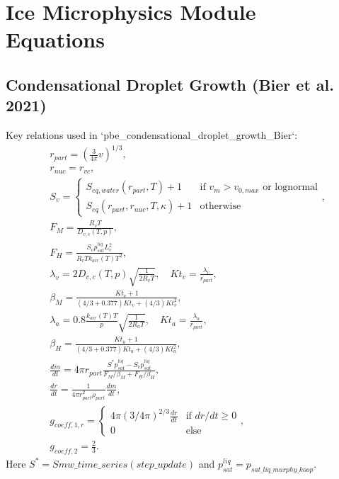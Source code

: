 \documentclass{article}
\begin{document}
\section*{Ice Microphysics Module Equations}

\subsection*{Condensational Droplet Growth (Bier et al. 2021)}
Key relations used in `pbe_condensational_droplet_growth_Bier`:
\begin{align}
&r_{part} = \left(\frac{3}{4\pi} v\right)^{1/3}, \\
&r_{nuc} = r_{vc}, \\
&S_v = \begin{cases}S_{eq,water}(r_{part},T)+1 & \text{if } v_m>v_{0,max} \text{ or lognormal}\\ S_{eq}(r_{part},r_{nuc},T,\kappa)+1 & \text{otherwise}\end{cases}, \\
&F_M = \frac{R_v T}{D_{v,c}(T,p)}, \\
&F_H = \frac{S_v p_{sat}^{liq} L_c^2}{R_v T k_{air}(T) T^2}, \\
&\lambda_v = 2 D_{v,c}(T,p)\sqrt{\frac{1}{2R_v T}}, \quad
K
t_v= \frac{\lambda_v}{r_{part}}, \\
&\beta_M = \frac{K
t_v+1}{(4/3+0.377)K
t_v+(4/3)K
t_v^2}, \\
&\lambda_a = 0.8 \frac{k_{air}(T)T}{p}\sqrt{\frac{1}{2R_a T}}, \quad K
t_a = \frac{\lambda_a}{r_{part}}, \\
&\beta_H = \frac{K
t_a+1}{(4/3+0.377)K
t_a+(4/3)K
t_a^2}, \\
&\frac{dm}{dt} = 4\pi r_{part}
\frac{S^* p_{sat}^{liq} - S_v p_{sat}^{liq}}{F_M/\beta_M + F_H/\beta_H}, \\
&\frac{dr}{dt} = \frac{1}{4\pi r_{part}^2 \rho_{part}}\frac{dm}{dt}, \\
&g_{coeff,1,r} = \begin{cases}4\pi (3/4\pi)^{2/3} \frac{dr}{dt} & \text{if } dr/dt\ge0\\0 & \text{else}\end{cases},
\\
&g_{coeff,2} = \frac{2}{3}.
\end{align}
Here $S^*=Smw\_time\_series(step\_update)$ and $p_{sat}^{liq}=p_{sat\_liq\_murphy\_koop}$.
\end{document}
